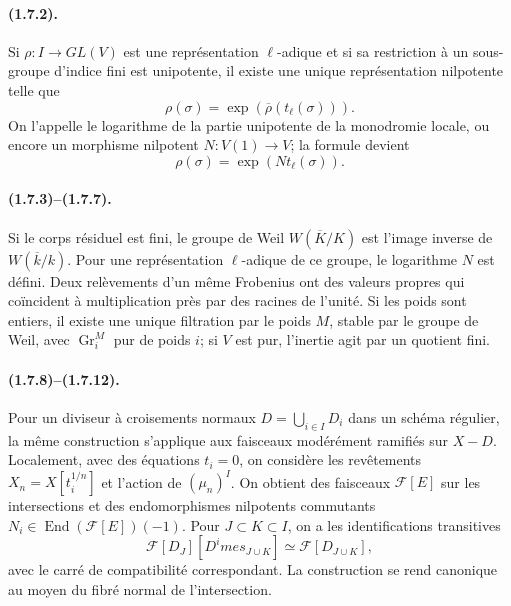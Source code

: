 \documentclass[11pt]{article}
\theoremstyle{remark}
\newcommand{\Gr}{\operatorname{Gr}}
\newcommand{\End}{\operatorname{End}}
\begin{document}
\paragraph{(1.7.2).} Si $\rho:I\to GL(V)$ est une représentation $\ell$-adique et si sa restriction à un sous-groupe d'indice fini est unipotente, il existe une unique représentation nilpotente telle que
\begin{equation}\tag{1.7.2.1}
        \rho(\sigma)=\exp(\overline\rho(t_\ell(\sigma))).
\end{equation}
On l'appelle le logarithme de la partie unipotente de la monodromie locale, ou encore un morphisme nilpotent $N:V(1)\to V$; la formule devient
\begin{equation}\tag{1.7.2.2}
        \rho(\sigma)=\exp(Nt_\ell(\sigma)).
\end{equation}

\paragraph{(1.7.3)--(1.7.7).} Si le corps résiduel est fini, le groupe de Weil $W(\overline K/K)$ est l'image inverse de $W(\overline k/k)$. Pour une représentation $\ell$-adique de ce groupe, le logarithme $N$ est défini. Deux relèvements d'un même Frobenius ont des valeurs propres qui coïncident à multiplication près par des racines de l'unité. Si les poids sont entiers, il existe une unique filtration par le poids $M$, stable par le groupe de Weil, avec $\Gr^M_i$ pur de poids $i$; si $V$ est pur, l'inertie agit par un quotient fini.

\paragraph{(1.7.8)--(1.7.12).} Pour un diviseur à croisements normaux $D=\bigcup_{i\in I}D_i$ dans un schéma régulier, la même construction s'applique aux faisceaux modérément ramifiés sur $X-D$. Localement, avec des équations $t_i=0$, on considère les revêtements $X_n=X[t_i^{1/n}]$ et l'action de $(\mu_n)^I$. On obtient des faisceaux $\mathcal F[E]$ sur les intersections et des endomorphismes nilpotents commutants $N_i\in\End(\mathcal F[E])(-1)$. Pour $J\subset K\subset I$, on a les identifications transitives
\begin{equation}\tag{1.7.9.1}
        \mathcal F[D_J][D^	imes_{J\cup K}]\simeq\mathcal F[D_{J\cup K}],
\end{equation}
avec le carré de compatibilité correspondant. La construction se rend canonique au moyen du fibré normal de l'intersection.
\end{document}
